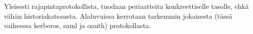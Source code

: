 Yleisesti rajapintaprotokollista, tuodaan periaatteita konkreettiselle tasolle, ehkä vähän historiakatsausta. Alaluvuissa kerrotaan tarkemmin jokaisesta (tässä vaiheessa kerberos, saml ja oauth) protokollasta.